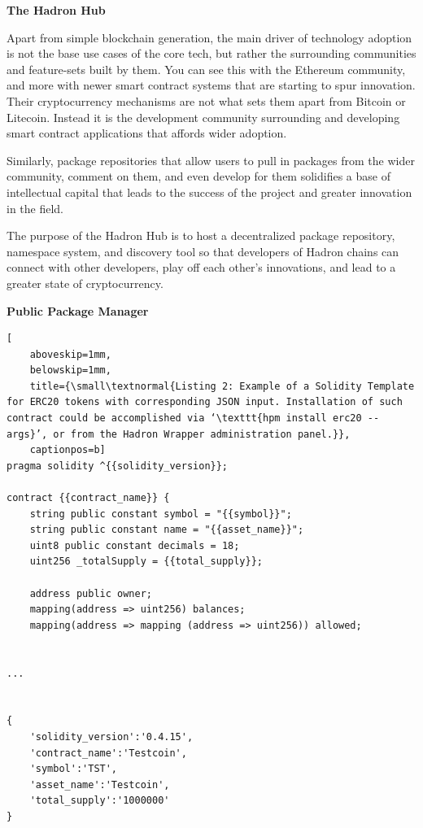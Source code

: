 \documentclass{%
	article}
\begin{document}
\begin{center}
\textbf{The Hadron Hub}
\end{center}

Apart from simple blockchain generation, the main driver of technology adoption is not the base use cases of the core tech, but rather the surrounding communities and feature-sets built by them. You can see this with the Ethereum community, and more with newer smart contract systems that are starting to spur innovation. Their cryptocurrency mechanisms are not what sets them apart from Bitcoin or Litecoin. Instead it is the development community surrounding and developing smart contract applications that affords wider adoption\cite{techecosystems}.

Similarly, package repositories that allow users to pull in packages from the wider community, comment on them, and even develop for them solidifies a base of intellectual capital that leads to the success of the project and greater innovation in the field.

The purpose of the Hadron Hub is to host a decentralized package repository, namespace system, and discovery tool so that developers of Hadron chains can connect with other developers, play off each other's innovations, and lead to a greater state of cryptocurrency.

\begin{center}
\textbf{Public Package Manager}
\end{center}

\begin{lstlisting}[
	aboveskip=1mm,
	belowskip=1mm,
	title={\small\textnormal{Listing 2: Example of a Solidity Template for ERC20 tokens with corresponding JSON input. Installation of such contract could be accomplished via ‘\texttt{hpm install erc20 --args}’, or from the Hadron Wrapper administration panel.}},
	captionpos=b]
pragma solidity ^{{solidity_version}};

contract {{contract_name}} {
    string public constant symbol = "{{symbol}}";
    string public constant name = "{{asset_name}}";
    uint8 public constant decimals = 18;
    uint256 _totalSupply = {{total_supply}};

    address public owner;
    mapping(address => uint256) balances;
    mapping(address => mapping (address => uint256)) allowed;
   
    
...


{
    'solidity_version':'0.4.15',
    'contract_name':'Testcoin',
    'symbol':'TST',
    'asset_name':'Testcoin',
    'total_supply':'1000000'
}
\end{lstlisting}
\end{document}
